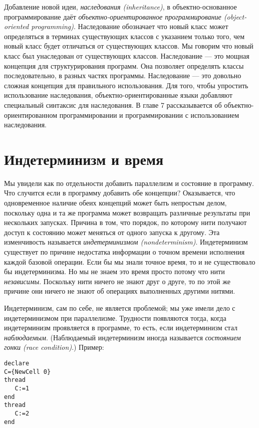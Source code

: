 Добавление новой идеи, \emph{наследования (inheritance)}, в объектно-ос\-но\-ван\-ное программирование даёт \emph{объектно-ориентированное программирование (object-oriented programming)}. Наследование обозначает что новый класс может определяться в терминах существующих классов с указанием только того, чем новый класс будет отличаться от существующих классов. Мы говорим что новый класс был унаследован от существующих классов. Наследование --- это мощная концепция для структурирования программ. Она позволяет определять классы последовательно, в разных частях программы. Наследование --- это довольно сложная концепция для правильного использования. Для того, чтобы упростить использование наследования, объектно-ориентированные языки добавляют специальный синтаксис для наследования. В главе 7 рассказывается об объектно-ориентированном программировании и программировании с использованием наследования.

\section{Индетерминизм и время}\label{section:indeterminism_and_time}

Мы увидели как по отдельности добавить параллелизм и состояние в программу. Что случится если в программу добавить обе концепции? Оказывается, что одновременное наличие обеих концепций может быть непростым делом, поскольку одна и та же программа может возвращать различные результаты при нескольких запусках. Причина в том, что порядок, по которому нити получают доступ к состоянию может меняться от одного запуска к другому. Эта изменчивость называется \emph{индетерминизмом (nondeterminism)}. Индетерминизм существует по причине недостатка информации о точном времени исполнения каждой базовой операции. Если бы мы знали точное время, то и не существовало бы индетерминизма. Но мы не знаем это время просто потому что нити \emph{независимы}. Поскольку нити ничего не знают друг о друге, то по этой же причине они ничего не знают об операциях выполненных другими нитями.

Индетерминизм, сам по себе, не является проблемой; мы уже имели дело с индетерминизмом при параллелизме. Трудности появляются тогда, когда индетерминизм проявляется в программе, то есть, если индетерминизм стал \emph{наблюдаемым}. (Наблюдаемый индетерминизм иногда называется \emph{состоянием гонки (race condition)}.) Пример:

\begin{lstlisting}
declare
C={NewCell 0}
thread
   C:=1
end
thread
   C:=2
end
\end{lstlisting}


